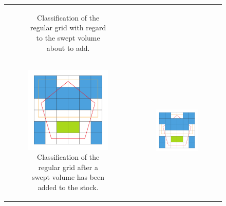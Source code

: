\begin{figure}[h]
\begin{tabular}{cc}
\begin{subfigure}[t]{0.3\textwidth}
			\caption{Classification of the regular grid with regard to the swept volume about to add.}
			\label{fig:classification_sv}
		\end{subfigure}\\
		\begin{subfigure}[t]{0.3\textwidth}
			\centering
			\includegraphics[width=\textwidth]{images/classification_after}
			\caption{Classification of the regular grid after a swept volume has been added to the stock.}
			\label{fig:classification_after}
		\end{subfigure}&
		\begin{subfigure}[t]{0.3\textwidth}
			\centering
			\includegraphics[width=\textwidth]{images/classification_after_removal}

\end{subfigure}
\end{tabular}
\end{figure}
